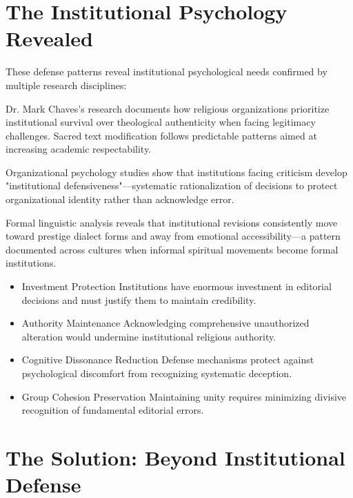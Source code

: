 \documentclass[11pt,twoside]{book}
\begin{document}
\section*{The Institutional Psychology Revealed}
\label{sec:orgc46adfb}

These defense patterns reveal institutional psychological needs confirmed by multiple research disciplines:

Dr. Mark Chaves's research documents how religious organizations prioritize institutional survival over theological authenticity when facing legitimacy challenges. Sacred text modification follows predictable patterns aimed at increasing academic respectability.

Organizational psychology studies show that institutions facing criticism develop "institutional defensiveness"—systematic rationalization of decisions to protect organizational identity rather than acknowledge error.

Formal linguistic analysis reveals that institutional revisions consistently move toward prestige dialect forms and away from emotional accessibility—a pattern documented across cultures when informal spiritual movements become formal institutions.
\begin{itemize}
\item Investment Protection
\label{sec:org0e94fd0}
Institutions have enormous investment in editorial decisions and must justify them to maintain credibility.
\item Authority Maintenance
\label{sec:orgc12c999}
Acknowledging comprehensive unauthorized alteration would undermine institutional religious authority.
\item Cognitive Dissonance Reduction
\label{sec:orgb77b897}
Defense mechanisms protect against psychological discomfort from recognizing systematic deception.
\item Group Cohesion Preservation
\label{sec:org9ecfa2d}
Maintaining unity requires minimizing divisive recognition of fundamental editorial errors.
\end{itemize}
\section*{The Solution: Beyond Institutional Defense}
\label{sec:org3f99ede}
\end{document}
